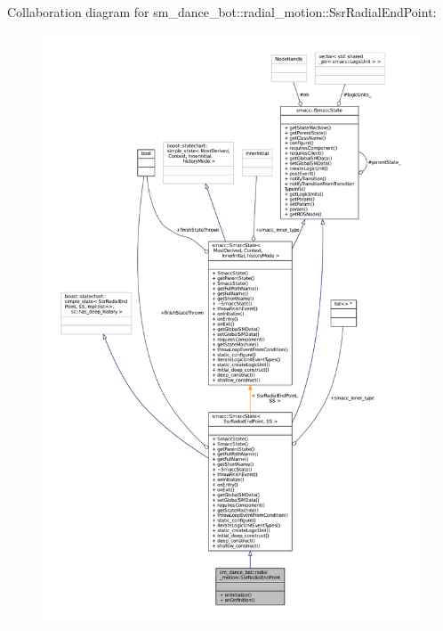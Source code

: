 Collaboration diagram for sm\+\_\+dance\+\_\+bot\+:\+:radial\+\_\+motion\+:\+:Ssr\+Radial\+End\+Point\+:
\nopagebreak
\begin{figure}[H]
\begin{center}
\leavevmode
\includegraphics[width=350pt]{structsm__dance__bot_1_1radial__motion_1_1SsrRadialEndPoint__coll__graph}
\end{center}
\end{figure}

